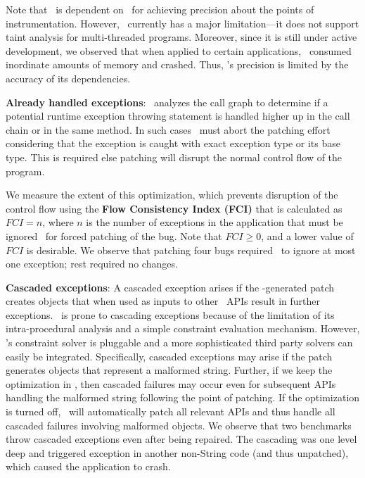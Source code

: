 \begin{mylist}
 Note that \tool\ is dependent on \infoflow\
for achieving precision about the points of instrumentation. However,
\infoflow\ currently has a major limitation---it does not support taint
analysis for multi-threaded programs. Moreover, since it is still under active
development, we observed that when applied to certain applications, \infoflow\
consumed inordinate amounts of memory and crashed. Thus, \tool's precision is
limited by the accuracy of its dependencies. 

\item \textbf{Already handled exceptions}: \tool\ analyzes the call graph to
determine if a potential runtime exception throwing statement is handled higher
up in the call chain or in the same method. In such cases \tool\ must abort the
patching effort considering that the exception is caught with exact exception
type or its base type. This is required else patching will disrupt the normal
control flow of the program.

We measure the extent of this optimization, which prevents disruption of the
control flow using the \textbf{Flow Consistency Index (FCI)} that is calculated
as $FCI = n$, where $n$ is the number of exceptions in the application that
must be ignored \tool\ for forced patching of the bug. Note that $FCI \ge 0$,
and a lower value of $FCI$ is desirable. We observe that patching four bugs
required \tool\ to ignore at most one exception; rest required no changes.

\item \textbf{Cascaded exceptions}: A cascaded exception arises if the
\tool-generated patch creates objects that when used as inputs to other \java\
APIs result in further exceptions.
\tool\ is prone to cascading exceptions because of the limitation of its
intra-procedural analysis and a simple constraint evaluation mechanism. However,
\tool's constraint solver is pluggable and a more sophisticated third party
solvers can easily be integrated.
Specifically, cascaded exceptions may arise if the patch generates 
objects that represent a malformed string. Further, if we keep the optimization
in , then cascaded failures may
occur even for subsequent  APIs handling the malformed
string following the point of patching. If the optimization is turned
off, \tool\ will automatically patch all relevant \code{String} APIs and thus
handle all cascaded failures involving malformed \code{String} objects.
We observe that two benchmarks throw cascaded exceptions even after being
repaired. The cascading was one level deep and triggered exception in another
non-String code (and thus unpatched), which caused the application to crash.

\end{mylist}

